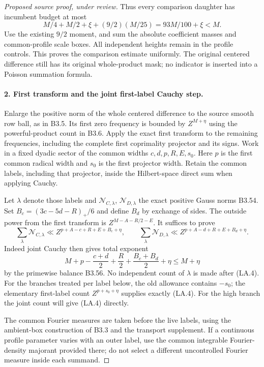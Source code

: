 \begin{proof}[Proposed source proof, under review]
Thus every comparison daughter has incumbent budget at most
\[
 M/4+M/2+\xi+(9/2)(M/25)=93M/100+\xi<M.
\]
Use the existing $9/2$ moment, and sum the absolute coefficient masses
and common-profile scale boxes. All independent heights remain in
the profile controls. This proves the comparison estimate uniformly.
The original centered difference still has its original whole-product
mask; no indicator is inserted into a Poisson summation formula.

\paragraph{2. First transform and the joint first-label Cauchy step.}
Enlarge the positive norm of the whole centered difference to the source
smooth row ball, as in B3.5. Its first zero frequency is bounded by
$Z^{M+\eta}$ using the powerful-product count in B3.6. Apply the exact
first transform to the remaining frequencies, including the complete
first coprimality projector and its signs. Work in a fixed dyadic sector
of the common widths $c,d,p,R,E,s_0$. Here $p$ is the first common
radical width and $s_0$ is the first projector width. Retain the common
labels, including that projector, inside the Hilbert-space direct sum
when applying Cauchy.

Let $\lambda$ denote those labels and $\mathcal N_{C,\lambda}$,
$\mathcal N_{D,\lambda}$ the exact positive Gauss norms B3.54.
Set $B_c=(3c-5d-R)_+/6$ and define $B_d$ by exchange of sides.
The outside power from the first transform is
$Z^{M-A-R/2-E}$. It suffices to prove
\[
 \sum_\lambda\mathcal N_{C,\lambda}
 \ll Z^{p+A-c+R+E+B_c+\eta},
 \qquad
 \sum_\lambda\mathcal N_{D,\lambda}
 \ll Z^{p+A-d+R+E+B_d+\eta}.
 \tag{LA.4}
\]
Indeed joint Cauchy then gives total exponent
\[
 M+p-\frac{c+d}{2}+\frac R2+\frac{B_c+B_d}{2}+\eta\le M+\eta
\]
by the primewise balance B3.56. No independent count of $\lambda$
is made after (LA.4). For the branches treated per label below, the
old allowance contains $-s_0$; the elementary first-label count
$Z^{p+s_0+\eta}$ supplies exactly (LA.4). For the high branch the
joint count will give (LA.4) directly.

The common Fourier measures are taken before the live labels, using the
ambient-box construction of B3.3 and the transport supplement. If a
continuous profile parameter varies with an outer label, use the common
integrable Fourier-density majorant provided there; do not select a
different uncontrolled Fourier measure inside each summand.


\end{proof}

